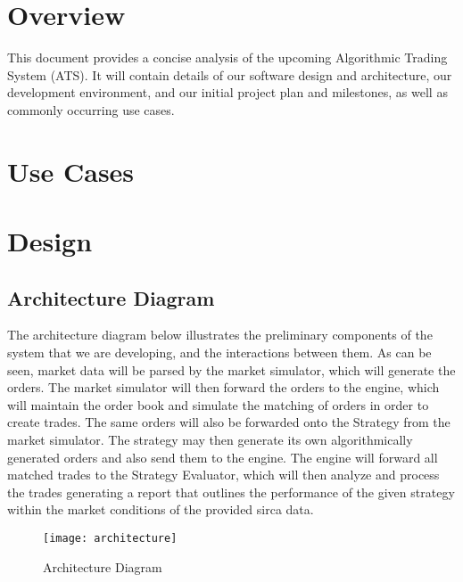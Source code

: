 \documentclass{article}
\begin{document}
\maketitle


\section{Overview}
This document provides a concise analysis of the upcoming Algorithmic Trading System (ATS). It will contain details of our software design and architecture, our development environment, and our initial project plan and milestones, as well as commonly occurring use cases.


\section{Use Cases}


\section{Design}
\subsection{Architecture Diagram}

The architecture diagram below illustrates the preliminary components of the system that we are developing, and the interactions between them. As can be seen, market data will be parsed by the market simulator, which will generate the orders. The market simulator will then forward the orders to the engine, which will maintain the order book and simulate the matching of orders in order to create trades. The same orders will also be forwarded onto the Strategy from the market simulator. The strategy may then generate its own algorithmically generated orders and also send them to the engine. The engine will forward all matched trades to the Strategy Evaluator, which will then analyze and process the trades generating a report that outlines the performance of the given strategy within the market conditions of the provided sirca data.

\begin{figure}
  \centering
  \texttt{[image: architecture]}
  \caption{Architecture Diagram}
\end{figure}
\end{document}
